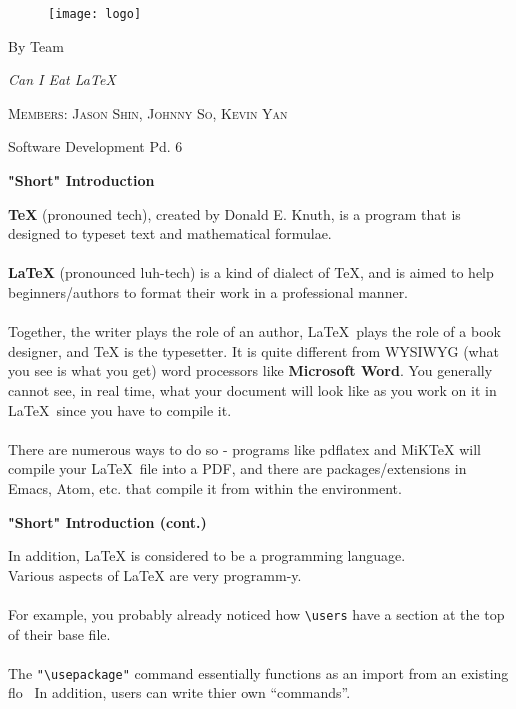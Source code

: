 \documentclass[a4paper,12pt]{article}
\begin{document}
\begin{titlepage}
	\begin{figure}[!ht]
		\centering
			\texttt{[image: logo]}
	\end{figure}
	\vspace{3cm}
	\centering
	{\huge By Team \par}
	\vspace{0.5cm}
	{\huge\itshape Can I Eat LaTeX \par}
	\vspace{2cm}
	{\scshape\Large  Members: Jason Shin, Johnny So, Kevin Yan\par}
	{\large Software Development Pd. 6}
\end{titlepage}
	

\newpage
\begin{center}
  	\bf{\Huge{"Short" Introduction}}
\end{center}
\bigskip
\Large
\textbf{\TeX} (pronouned tech), created by Donald E. Knuth, is a program that is
designed to typeset text and mathematical formulae. \\\\
\textbf{\LaTeX} (pronounced luh-tech) is a kind of dialect of TeX, and is aimed to help beginners/authors to
format their work in a professional manner. \\\\
Together, the writer plays the role of an author, \LaTeX\ plays the role of a book designer, and TeX is the
typesetter. It is quite different from WYSIWYG (what you see is what you get)
word processors like \textbf{Microsoft Word}. You generally cannot see, in real
time, what your document will look like as you work on it in \LaTeX\ since you
have to compile it. \\\\
There are numerous ways to do so - programs like pdflatex and MiKTeX will
compile your \LaTeX\ file into a PDF, and there are packages/extensions in Emacs, Atom, etc.
that compile it from within the environment.

\newpage
\begin{center}
	\bf{\Huge{"Short" Introduction (cont.)}}
\end{center}
In addition, LaTeX is considered to be a programming language. \\
Various aspects of LaTeX are very programm-y. \\\\
For example, you probably already noticed
how \verb|\users| have a section at the top of their base file. \\\\
The \verb|"\usepackage"| command essentially functions as an import from an existing flo \
In addition, users can write thier own ``commands''.
\end{document}
